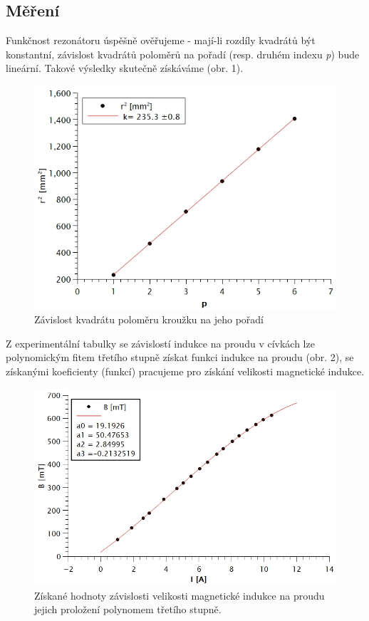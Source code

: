 \documentclass[czech,11pt,a4paper]{article}
\begin{document}
\begin{multicols}{2}
		\section{Měření}
		Funkčnost rezonátoru úspěšně ověřujeme - mají-li rozdíly kvadrátů být konstantní, závislost kvadrátů poloměrů na pořadí (resp. druhém indexu \textit{p}) bude lineární. Takové výsledky skutečně získáváme (obr. 1).
		\begin{figure}[H]
			\centering
			\includegraphics[width=0.9\linewidth]{fit}
			\caption{Závislost kvadrátu poloměru kroužku na jeho pořadí}
			\label{fig:mereni}
		\end{figure}
		Z experimentální tabulky se závislostí indukce na proudu v cívkách lze polynomickým fitem třetího stupně získat funkci indukce na proudu (obr. 2), se získanými koeficienty (funkcí) pracujeme pro získání velikosti magnetické indukce.
		\begin{figure}[H]
			\centering
			\includegraphics[width=0.9\linewidth]{indukce}
			\caption{Získané hodnoty závislosti velikosti magnetické indukce na proudu jejich proložení polynomem třetího stupně.}
			\label{fig:mereni}
		\end{figure}
		

\end{multicols}
\end{document}
